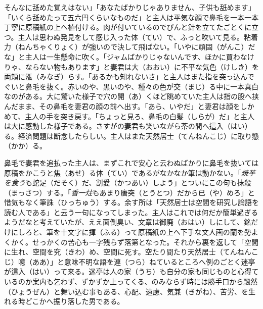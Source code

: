 \documentclass{book}
\begin{document}
そんなに舐めた覚えはない」「あなたばかりじゃありません、子供も舐めます」「いくら舐めたって五六円くらいなものだ」と主人は平気な顔で鼻毛を一本一本丁寧に原稿紙の上へ植付ける。肉が付いているのでぴんと針を立てたごとくに立つ。主人は思わぬ発見をして感じ入った体（てい）で、ふっと吹いて見る。粘着力（ねんちゃくりょく）が強いので決して飛ばない。「いやに頑固（がんこ）だな」と主人は一生懸命に吹く。「ジャムばかりじゃないんです、ほかに買わなけりゃ、ならない物もあります」と妻君は大（おおい）に不平な気色（けしき）を両頬に漲（みなぎ）らす。「あるかも知れないさ」と主人はまた指を突っ込んでぐいと鼻毛を抜く。赤いのや、黒いのや、種々の色が交（まじ）る中に一本真白なのがある。大に驚いた様子で穴の開（あ）くほど眺めていた主人は指の股へ挟んだまま、その鼻毛を妻君の顔の前へ出す。「あら、いやだ」と妻君は顔をしかめて、主人の手を突き戻す。「ちょっと見ろ、鼻毛の白髪（しらが）だ」と主人は大に感動した様子である。さすがの妻君も笑いながら茶の間へ這入（はい）る。経済問題は断念したらしい。主人はまた天然居士（てんねんこじ）に取り懸（かか）る。

鼻毛で妻君を追払った主人は、まずこれで安心と云わぬばかりに鼻毛を抜いては原稿をかこうと焦（あせ）る体（てい）であるがなかなか筆は動かない。「\emph{焼芋を食う}も蛇足（だそく）だ、割愛（かつあい）しよう」とついにこの句も抹殺（まっさつ）する。「\emph{香一炷}もあまり唐突（とうとつ）だから已（や）めろ」と惜気もなく筆誅（ひっちゅう）する。余す所は「天然居士は空間を研究し論語を読む人である」と云う一句になってしまった。主人はこれでは何だか簡単過ぎるようだなと考えていたが、ええ面倒臭い、文章は御廃（おはい）しにして、銘だけにしろと、筆を十文字に揮（ふる）って原稿紙の上へ下手な文人画の蘭を勢よくかく。せっかくの苦心も一字残らず落第となった。それから裏を返して「空間に生れ、空間を究（きわ）め、空間に死す。空たり間たり天然居士（てんねんこじ）噫（ああ）」と意味不明な語を連（つら）ねているところへ例のごとく迷亭が這入（はい）って来る。迷亭は人の家（うち）も自分の家も同じものと心得ているのか案内も乞わず、ずかずか上ってくる、のみならず時には勝手口から飄然（ひょうぜん）と舞い込む事もある、心配、遠慮、気兼（きがね）、苦労、を生れる時どこかへ振り落した男である。
\end{document}
